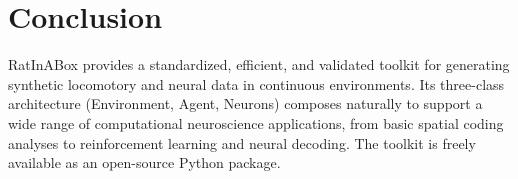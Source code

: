 \documentclass[12pt]{article}
\begin{document}
\section{Conclusion}

RatInABox provides a standardized, efficient, and validated toolkit for generating synthetic locomotory and neural data in continuous environments. Its three-class architecture (Environment, Agent, Neurons) composes naturally to support a wide range of computational neuroscience applications, from basic spatial coding analyses to reinforcement learning and neural decoding. The toolkit is freely available as an open-source Python package.



\end{document}
